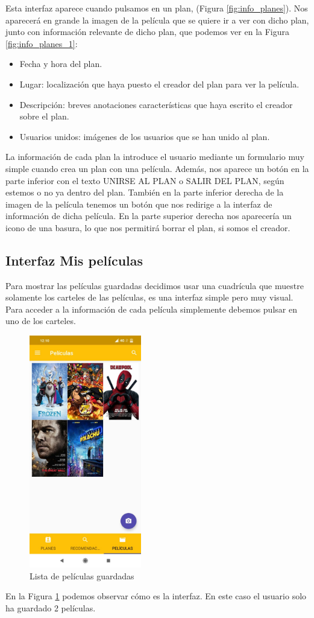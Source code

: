 Esta interfaz aparece cuando pulsamos en un plan, (Figura \ref{fig:info_planes}). Nos aparecerá en grande la imagen de la película que se quiere ir a ver con dicho plan, junto con información
relevante de dicho plan, que podemos ver en la Figura \ref{fig:info_planes_1}:
\begin{itemize}
    \item Fecha y hora del plan.
    \item Lugar: localización que haya puesto el creador del plan para ver la película.
    \item Descripción: breves anotaciones características que haya escrito el creador sobre el plan.
    \item Usuarios unidos: imágenes de los usuarios que se han unido al plan.
\end{itemize}
\vspace{1cm}

La información de cada plan la introduce el usuario mediante un formulario muy simple cuando crea un plan con una película.
Además, nos aparece un botón en la parte inferior con el texto UNIRSE AL PLAN o SALIR DEL PLAN, según estemos o no ya dentro del plan.
También en la parte inferior derecha de la imagen de la película tenemos un botón que nos redirige a la interfaz de información de dicha película.
En la parte superior derecha nos aparecería un icono de una basura, lo que nos permitirá borrar el plan, si somos el creador.

\subsection{Interfaz Mis películas}
\label{makereference3.4.4}
Para mostrar las películas guardadas decidimos usar una cuadrícula que muestre solamente los carteles de las películas, es una interfaz simple pero muy visual. Para acceder a la información
de cada película simplemente debemos pulsar en uno de los carteles.
\begin{figure}[H]
    \centering
    \includegraphics[height=4in]{figures/chapter-3/film-list.jpg}
    \caption{Lista de películas guardadas}
    \label{fig:lista_peliculas}
\end{figure}
En la Figura \ref{fig:lista_peliculas} podemos observar cómo es la interfaz. En este caso el usuario solo ha guardado 2 películas.
